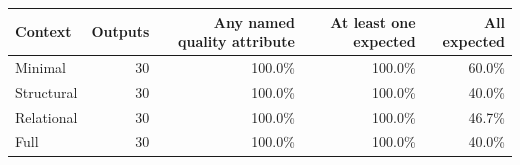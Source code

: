 \begin{tabular}{lrrrr}
\toprule
Context & Outputs & Any named quality attribute & At least one expected & All expected \\
\midrule
Minimal & 30 & 100.0\% & 100.0\% & 60.0\% \\
Structural & 30 & 100.0\% & 100.0\% & 40.0\% \\
Relational & 30 & 100.0\% & 100.0\% & 46.7\% \\
Full & 30 & 100.0\% & 100.0\% & 40.0\% \\
\bottomrule
\end{tabular}
